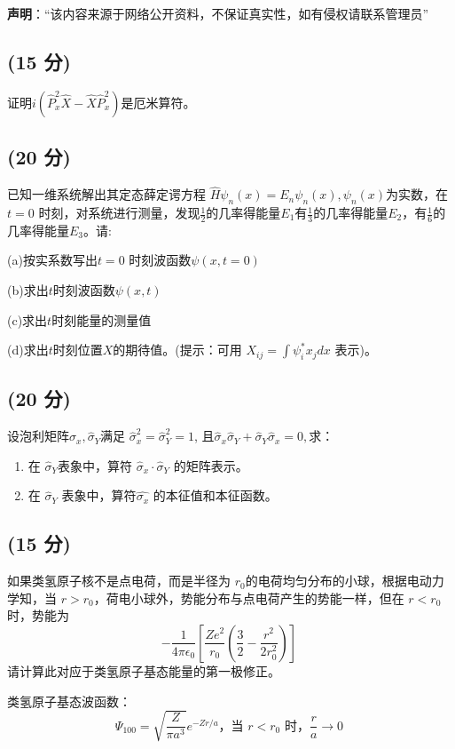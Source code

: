 
\textbf{声明}：“该内容来源于网络公开资料，不保证真实性，如有侵权请联系管理员”

\subsection{(15 分)}
证明$i\left(\hat{P}_x^2\hat{X} - \hat{X}\hat{P}_x^2\right)$是厄米算符。
\subsection{(20 分)}
已知一维系统解出其定态薛定谔方程 $\hat{H} \psi_n(x) = E_n \psi_n(x), \psi_n(x)$为实数，在 $t=0$ 时刻，对系统进行测量，发现$\frac{1}{2}$的几率得能量$E_1$有$\frac{1}{3}$的几率得能量$E_2$，有$\frac{1}{6}$的几率得能量$E_3$。请:

(a)按实系数写出$t=0$ 时刻波函数$\psi(x, t=0)$

(b)求出$t$时刻波函数$\psi(x, t)$

(c)求出$t$时刻能量的测量值

(d)求出$t$时刻位置$X$的期待值。(提示：可用  $X_{ij} = \int \psi_i^* x_j dx$ 表示)。
\subsection{(20 分)}
设泡利矩阵$\hat{\sigma}_x, \hat{\sigma}_Y$满足 $\hat{\sigma}_x^2 = \hat{\sigma}_Y^2 = 1$, 且$\hat{\sigma}_x \hat{\sigma}_Y + \hat{\sigma}_Y \hat{\sigma}_x = 0,$求：

\begin{enumerate}
    \item 在 $\hat{\sigma}_Y $表象中，算符 $\hat{\sigma}_x \cdot \hat{\sigma}_Y$ 的矩阵表示。
    \item 在 $\hat{\sigma}_Y$  表象中，算符$\hat{\sigma_x }$ 的本征值和本征函数。
\end{enumerate}
\subsection{(15 分)}
如果类氢原子核不是点电荷，而是半径为 $r_0 $的电荷均匀分布的小球，根据电动力学知，当 $r > r_0 $，荷电小球外，势能分布与点电荷产生的势能一样，但在 $r < r_0$ 时，势能为 
$$-\frac{1}{4 \pi \epsilon_0} \left[ \frac{Ze^2}{r_0} \left( \frac{3}{2} - \frac{r^2}{2r_0^2} \right) \right]~$$
请计算此对应于类氢原子基态能量的第一极修正。

类氢原子基态波函数：$$\Psi_{100} = \sqrt{\frac{Z}{\pi a^3}} e^{-Zr/a} \text{，当 } r < r_0 \text{ 时，} \frac{r}{a} \to 0~$$
